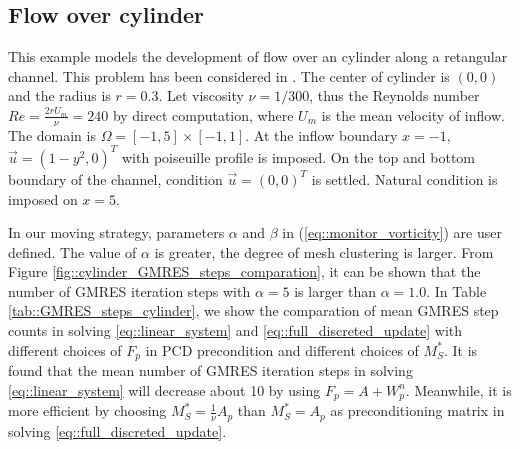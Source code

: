 \documentclass{eajam}
\begin{document}


   \subsection{Flow over cylinder}
   
      This example models the development of flow over an cylinder
      along a retangular channel. This problem has been considered in
      \cite{cao1999anr}. The center of cylinder is $(0, 0)$ and the
      radius is $r = 0.3$. Let viscosity $\nu = 1/300$, thus the
      Reynolds number $Re = \frac{2rU_{m}}{\nu} = 240$ by direct
      computation, where $U_{m}$ is the mean velocity of inflow. The
      domain is $\Omega = [-1, 5] \times [-1, 1]$. At the inflow
      boundary $x = -1$, $\vec{u} = (1 - y^2, 0)^T$ with poiseuille
      profile is imposed. On the top and bottom boundary of the
      channel, condition $\vec{u} = (0, 0)^T$ is settled. Natural
      condition is imposed on $x = 5$. 
      
      In our moving strategy, parameters $\alpha$ and $\beta$ in
      (\ref{eq::monitor_vorticity}) are user defined. The value of
      $\alpha$ is greater, the degree of mesh clustering is larger. 
      From Figure \ref{fig::cylinder_GMRES_steps_comparation}, it can be
      shown that the number of GMRES iteration steps with $\alpha = 5$
      is larger than $\alpha = 1.0$. In Table
      \ref{tab::GMRES_steps_cylinder}, we show the comparation of mean GMRES step
      counts in solving \eqref{eq::linear_system} and
      \eqref{eq::full_discreted_update} with different choices of
      $F_p$ in PCD precondition and different choices of $M_S^*$. It is found
      that the mean number of GMRES iteration steps in solving
      \eqref{eq::linear_system} will decrease about 10 by  
      using $F_p = A + W_p^n$. Meanwhile, it is more efficient by
      choosing $M_S^* = \frac{1}{\nu} A_p$ than $M_S^* = A_p$ as
      preconditioning matrix in solving \eqref{eq::full_discreted_update}. 
\end{document}
